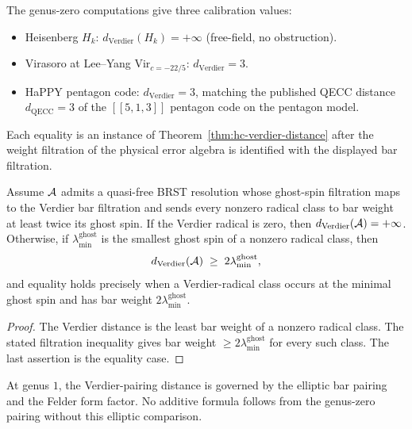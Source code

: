\begin{remark}
\label{cor:hc-verdier-distance-examples}
The genus-zero computations give three calibration values:
\begin{itemize}
 \item Heisenberg $H_k$: $d_{\mathrm{Verdier}}(H_k) = +\infty$
 \textup{(}free-field, no obstruction\textup{).}
 \item Virasoro at Lee--Yang $\mathrm{Vir}_{c = -22/5}$:
 $d_{\mathrm{Verdier}} = 3$.
 \item HaPPY pentagon code: $d_{\mathrm{Verdier}} = 3$, matching the
 published QECC distance $d_{\mathrm{QECC}} = 3$ of the
 $[[5, 1, 3]]$ pentagon code on the pentagon model.
\end{itemize}
Each equality is an instance of Theorem~\ref{thm:hc-verdier-distance}
after the weight filtration of the physical error algebra is identified
with the displayed bar filtration.
\end{remark}

\begin{proposition}
\label{rem:brst-verdier-lower-bound}
Assume $\mathcal{A}$ admits a quasi-free BRST resolution whose ghost-spin
filtration maps to the Verdier bar filtration and sends every nonzero
radical class to bar weight at least twice its ghost spin. If the
Verdier radical is zero, then $d_{\mathrm{Verdier}}(\mathcal{A})=+\infty$.
Otherwise, if
$\lambda_{\min}^{\mathrm{ghost}}$ is the smallest ghost spin of a
nonzero radical class, then
\[
 d_{\mathrm{Verdier}}(\mathcal{A}) \;\geq\; 2 \lambda_{\min}^{\mathrm{ghost}},
\]
and equality holds precisely when a Verdier-radical class occurs at the
minimal ghost spin and has bar weight
$2\lambda_{\min}^{\mathrm{ghost}}$.
\end{proposition}

\begin{proof}
The Verdier distance is the least bar weight of a nonzero radical
class. The stated filtration inequality gives bar weight
$\geq 2\lambda_{\min}^{\mathrm{ghost}}$ for every such class. The last
assertion is the equality case.
\end{proof}

\begin{conjecture}
\label{conj:verdier-distance-g1}
At genus $1$, the Verdier-pairing distance is governed by the elliptic
bar pairing and the Felder form factor. No additive formula follows
from the genus-zero pairing without this elliptic comparison.
\end{conjecture}

